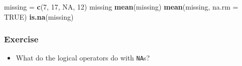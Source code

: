 \documentclass[
]{article}
\newenvironment{Shaded}{\begin{snugshade}}{\end{snugshade}}
\newcommand{\DataTypeTok}[1]{\textcolor[rgb]{0.13,0.29,0.53}{#1}}
\newcommand{\DecValTok}[1]{\textcolor[rgb]{0.00,0.00,0.81}{#1}}
\newcommand{\KeywordTok}[1]{\textcolor[rgb]{0.13,0.29,0.53}{\textbf{#1}}}
\newcommand{\NormalTok}[1]{#1}
\newcommand{\OtherTok}[1]{\textcolor[rgb]{0.56,0.35,0.01}{#1}}
\newcommand{\StringTok}[1]{\textcolor[rgb]{0.31,0.60,0.02}{#1}}
\providecommand{\tightlist}{%
  \setlength{\itemsep}{0pt}\setlength{\parskip}{0pt}}
\begin{document}
\begin{Shaded}
\begin{Highlighting}[]
\NormalTok{missing =}\StringTok{ }\KeywordTok{c}\NormalTok{(}\DecValTok{7}\NormalTok{, }\DecValTok{17}\NormalTok{, }\OtherTok{NA}\NormalTok{, }\DecValTok{12}\NormalTok{)}
\NormalTok{missing}
\KeywordTok{mean}\NormalTok{(missing)}
\KeywordTok{mean}\NormalTok{(missing, }\DataTypeTok{na.rm =} \OtherTok{TRUE}\NormalTok{)}
\KeywordTok{is.na}\NormalTok{(missing)}
\end{Highlighting}
\end{Shaded}

\hypertarget{exercise-3}{%
\subsubsection{Exercise}\label{exercise-3}}

\begin{itemize}
\tightlist
\item
  What do the logical operators do with \texttt{NA}s?
\end{itemize}
\end{document}
